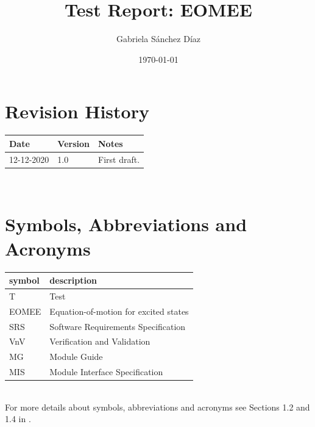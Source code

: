 \documentclass[12pt, titlepage]{article}
\begin{document}
\title{Test Report: EOMEE} 
\author{Gabriela S\'anchez D\'iaz}
\date{\today}
	
\maketitle


\section{Revision History}

\begin{tabularx}{\textwidth}{p{3cm}p{2cm}X}
\toprule {\bf Date} & {\bf Version} & {\bf Notes}\\
\midrule
12-12-2020 & 1.0 & First draft.\\
\bottomrule
\end{tabularx}

~\newpage

\section{Symbols, Abbreviations and Acronyms}

\renewcommand{\arraystretch}{1.2}
\begin{tabular}{l l} 
  \toprule		
  \textbf{symbol} & \textbf{description}\\
  \midrule 
  T & Test\\
  EOMEE & Equation-of-motion for excited states\\
  SRS & Software Requirements Specification\\
  VnV & Verification and Validation\\
  MG & Module Guide\\
  MIS & Module Interface Specification\\
  \bottomrule
\end{tabular}\\

For more details about symbols, abbreviations and acronyms see 
Sections 1.2 and 
1.4 in \cite{SRS2020}.

\newpage

\tableofcontents

\listoftables %

\listoffigures %

\newpage
\end{document}
